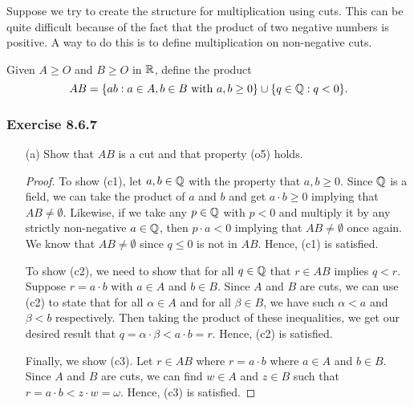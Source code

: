 Suppose we try to create the structure for multiplication using cuts. This can be quite difficult because of the fact that the product of two negative numbers is positive. A way to do this is to define multiplication on non-negative cuts.

Given \( A \geq O  \) and \( B \geq O  \) in \( \mathbb{R}  \), define the product 
\[  AB = \{ ab: a \in A , b \in B \ \text{with} \ a,b \geq 0  \} \cup \{ q \in \mathbb{Q} : q < 0  \}. \]

\subsubsection{Exercise 8.6.7} 
\begin{enumerate}
    \item[(a)] Show that \( AB  \) is a cut and that property (o5) holds.
        \begin{proof}
        To show (c1), let \( a , b \in \mathbb{Q}  \) with the property that \( a,b \geq  0  \). Since \( \mathbb{Q} \) is a field, we can take the product of \( a  \) and \(  b  \) and get \( a \cdot b \geq 0  \) implying that \( AB \neq \emptyset \). Likewise, if we take any \( p \in \mathbb{Q}  \) with \( p < 0  \) and multiply it by any strictly non-negative \( a \in \mathbb{Q}  \), then \( p \cdot a < 0  \) implying that \( AB \neq \emptyset  \) once again. We know that \( AB \neq \emptyset  \) since \( q \leq  0  \) is not in \( A B  \). Hence, (c1) is satisfied.

    To show (c2), we need to show that for all \( q \in \mathbb{Q}  \) that \(  r \in A B  \) implies \( q < r  \). Suppose \( r = a \cdot b  \) with \( a \in A \) and \( b \in B  \). Since \( A   \) and \( B  \) are cuts, we can use (c2) to state that for all  \( \alpha \in A  \) and for all \( \beta \in B  \), we have such \(  \alpha < a   \) and \( \beta < b  \) respectively. Then taking the product of these inequalities, we get our desired result that \( q =  \alpha \cdot \beta < a \cdot b = r \). Hence, (c2) is satisfied.

    Finally, we show (c3). Let \( r \in AB  \) where \( r = a \cdot  b \) where \( a \in A  \) and \( b \in B \). Since \( A  \) and \( B  \) are cuts, we can find \(  w \in A  \) and \( z \in B  \) such that \( r = a \cdot b < z \cdot w = \omega \). Hence, (c3) is satisfied.


\end{proof}
\end{enumerate}
